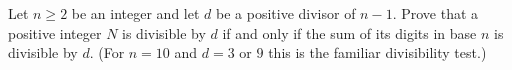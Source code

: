 Let $n\ge2$ be an integer and let $d$ be a positive divisor of $n-1$. Prove that a positive integer $N$ is divisible by $d$ if and only if the sum of its digits in base $n$ is divisible by $d$. (For $n=10$ and $d=3$ or $9$ this is the familiar divisibility test.)

